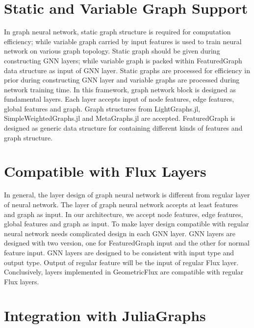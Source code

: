 \documentclass{juliacon}
\begin{document}
\section{Static and Variable Graph Support}

In graph neural network, static graph structure is required for computation efficiency;
while variable graph carried by input features is used to train neural network on various
graph topology. Static graph should be given during constructing GNN layers; while variable
graph is packed within FeaturedGraph data structure as input of GNN layer. Static graphs are
processed for efficiency in prior during constructing GNN layer and variable graphs are
processed during network training time. In this framework, graph network block is designed as
fundamental layers. Each layer accepts input of node features, edge features, global features
and graph. Graph structures from LightGraphs.jl, SimpleWeightedGraphs.jl and MetaGraphs.jl
are accepted. FeaturedGraph is designed as generic data structure for containing different
kinds of features and graph structure.

\section{Compatible with Flux Layers}

In general, the layer design of graph neural network is different from regular layer of
neural network. The layer of graph neural network accepts at least features and graph as input.
In our architecture, we accept node features, edge features, global features and graph as input.
To make layer design compatible with regular neural network needs complicated design in
each GNN layer. GNN layers are designed with two version, one for FeaturedGraph input and
the other for normal feature input. GNN layers are designed to be consistent with input type
and output type. Output of regular feature will be the input of regular Flux layer.
Conclusively, layers implemented in GeometricFlux are compatible with regular Flux layers.

\section{Integration with JuliaGraphs}
\end{document}
